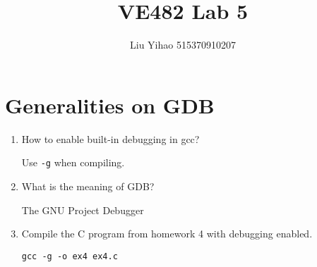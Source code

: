 \documentclass{article}
\title{VE482 Lab 5}
\author{Liu Yihao 515370910207}
\date{}
\begin{document}
\maketitle

\section{Generalities on GDB}
\begin{enumerate}
\item How to enable built-in debugging in gcc?

Use \texttt{-g} when compiling.

\item What is the meaning of GDB?

The GNU Project Debugger

\item Compile the C program from homework 4 with debugging enabled.

\begin{verbatim}
gcc -g -o ex4 ex4.c
\end{verbatim}

\end{enumerate}
\end{document}
